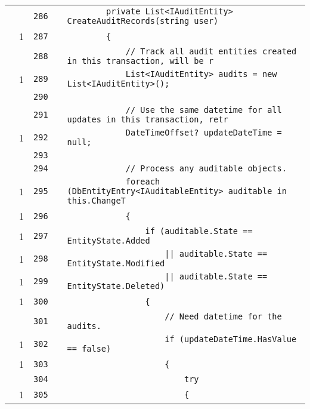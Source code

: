 \documentclass[a4paper,10pt]{article}
\begin{document}
\begin{longtable}[l]{lrrll}
\cellcolor{gray} &  & \verb~286~ & & \verb~        private List<IAuditEntity> CreateAuditRecords(string user)~\\
\cellcolor{green} & 1 & \verb~287~ & & \verb~        {~\\
\cellcolor{gray} &  & \verb~288~ & & \verb~            // Track all audit entities created in this transaction, will be r~\\
\cellcolor{green} & 1 & \verb~289~ & & \verb~            List<IAuditEntity> audits = new List<IAuditEntity>();~\\
\cellcolor{gray} &  & \verb~290~ & & \verb~~\\
\cellcolor{gray} &  & \verb~291~ & & \verb~            // Use the same datetime for all updates in this transaction, retr~\\
\cellcolor{green} & 1 & \verb~292~ & & \verb~            DateTimeOffset? updateDateTime = null;~\\
\cellcolor{gray} &  & \verb~293~ & & \verb~~\\
\cellcolor{gray} &  & \verb~294~ & & \verb~            // Process any auditable objects.~\\
\cellcolor{green} & 1 & \verb~295~ & & \verb~            foreach (DbEntityEntry<IAuditableEntity> auditable in this.ChangeT~\\
\cellcolor{green} & 1 & \verb~296~ & & \verb~            {~\\
\cellcolor{green} & 1 & \verb~297~ & & \verb~                if (auditable.State == EntityState.Added~\\
\cellcolor{green} & 1 & \verb~298~ & & \verb~                    || auditable.State == EntityState.Modified~\\
\cellcolor{green} & 1 & \verb~299~ & & \verb~                    || auditable.State == EntityState.Deleted)~\\
\cellcolor{green} & 1 & \verb~300~ & & \verb~                {~\\
\cellcolor{gray} &  & \verb~301~ & & \verb~                    // Need datetime for the audits.~\\
\cellcolor{green} & 1 & \verb~302~ & & \verb~                    if (updateDateTime.HasValue == false)~\\
\cellcolor{green} & 1 & \verb~303~ & & \verb~                    {~\\
\cellcolor{gray} &  & \verb~304~ & & \verb~                        try~\\
\cellcolor{green} & 1 & \verb~305~ & & \verb~                        {~\\

\end{longtable}
\end{document}
